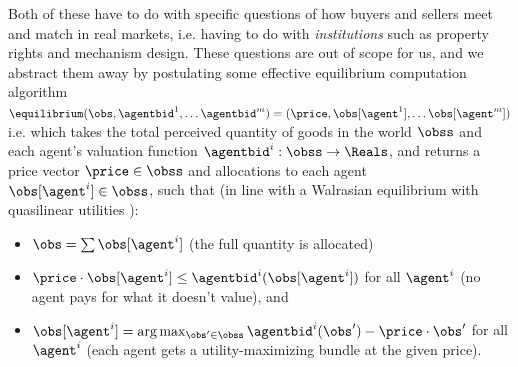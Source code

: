 Both of these have to do with specific questions of how buyers and sellers meet and match in real markets, i.e. having to do with \emph{institutions} such as property rights and mechanism design. These questions are out of scope for us, and we abstract them away by postulating some effective equilibrium computation algorithm $\equilibrium(\obs,\agentbid^1,\dots\agentbid^m)=(\price, \obs[\agent^1],\dots\obs[\agent^m])$ i.e. which takes the total perceived quantity of goods in the world $\obss$ and each agent's valuation function $\agentbid^i:\obss\to\Reals$, and returns a price vector $\price\in\obss$ and allocations to each agent $\obs[\agent^i]\in\obss$, such that (in line with a Walrasian equilibrium with quasilinear utilities \citep{millerNotesMicroeconomicTheory2006}):
\begin{itemize}
    \item $\obs=\sum\obs[\agent^i]$ (the full quantity is allocated)
    \item $\price\cdot\obs[\agent^i]\le\agentbid^i(\obs[\agent^i])$ for all $\agent^i$ (no agent pays for what it doesn't value), and
    \item $\obs[\agent^i]=\arg\max_{\obs'\in\obss}\agentbid^i(\obs')-\price\cdot\obs'$ for all $\agent^i$ (each agent gets a utility-maximizing bundle at the given price).
\end{itemize}




